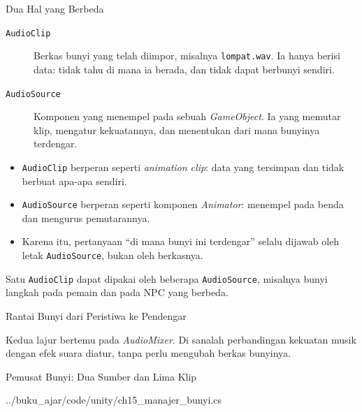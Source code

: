 \documentclass[aspectratio=169,10pt]{beamer}
\begin{document}
\begin{frame}{Dua Hal yang Berbeda}
\begin{description}
  \item[\texttt{AudioClip}] Berkas bunyi yang telah diimpor, misalnya
        \texttt{lompat.wav}. Ia hanya berisi data: tidak tahu di mana ia
        berada, dan tidak dapat berbunyi sendiri.
  \item[\texttt{AudioSource}] Komponen yang menempel pada sebuah
        \emph{GameObject}. Ia yang memutar klip, mengatur kekuatannya, dan
        menentukan dari mana bunyinya terdengar.
\end{description}
\vspace{0.12cm}
\begin{itemize}
  \item \texttt{AudioClip} berperan seperti \emph{animation clip}: data yang
        tersimpan dan tidak berbuat apa-apa sendiri.
  \item \texttt{AudioSource} berperan seperti komponen \emph{Animator}:
        menempel pada benda dan mengurus pemutarannya.
  \item Karena itu, pertanyaan ``di mana bunyi ini terdengar'' selalu dijawab
        oleh letak \texttt{AudioSource}, bukan oleh berkasnya.
\end{itemize}
\begin{kotak}
Satu \texttt{AudioClip} dapat dipakai oleh beberapa \texttt{AudioSource},
misalnya bunyi langkah pada pemain dan pada NPC yang berbeda.
\end{kotak}
\end{frame}

\begin{frame}{Rantai Bunyi dari Peristiwa ke Pendengar}
\centering
{}
\vspace{0.12cm}
\begin{kotak}
Kedua lajur bertemu pada \emph{AudioMixer}. Di sanalah perbandingan kekuatan
musik dengan efek suara diatur, tanpa perlu mengubah berkas bunyinya.
\end{kotak}
\end{frame}

\begin{frame}[fragile]{Pemusat Bunyi: Dua Sumber dan Lima Klip}

  {../buku_ajar/code/unity/ch15_manajer_bunyi.cs}
\end{frame}
\end{document}
